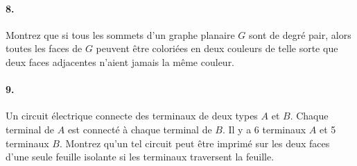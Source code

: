 \paragraph{8. }Montrez que si tous les sommets d'un graphe planaire $G$ sont de degré pair, alors toutes les faces de $G$ peuvent être coloriées en deux couleurs de telle sorte que deux faces adjacentes n'aient jamais la même couleur. 

\paragraph{9. }Un circuit électrique connecte des terminaux de deux types $A$ et $B$. Chaque terminal de $A$ est connecté à chaque terminal de $B$. Il y a 6 terminaux $A$ et 5 terminaux $B$. Montrez qu'un tel circuit peut être imprimé sur les deux faces d'une seule feuille isolante si les terminaux traversent la feuille.